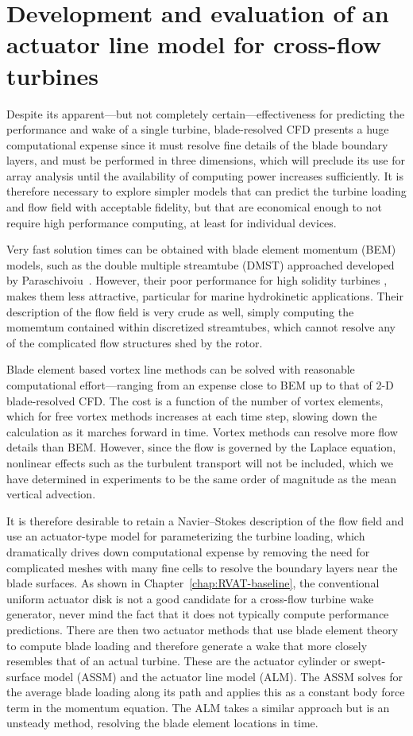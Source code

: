 \chapter{Development and evaluation of an actuator line model for cross-flow
    turbines}\label{chap:ALM}

Despite its apparent---but not completely certain---effectiveness for predicting
the performance and wake of a single turbine, blade-resolved CFD presents a huge
computational expense since it must resolve fine details of the blade boundary
layers, and must be performed in three dimensions, which will preclude its use
for array analysis until the availability of computing power increases
sufficiently. It is therefore necessary to explore simpler models that can
predict the turbine loading and flow field with acceptable fidelity, but that
are economical enough to not require high performance computing, at least for
individual devices.

Very fast solution times can be obtained with blade element momentum (BEM)
models, such as the double multiple streamtube (DMST) approached developed by
Paraschivoiu~\cite{Para1988}. However, their poor performance for high solidity
turbines \cite{Joo2015}, makes them less attractive, particular for marine
hydrokinetic applications. Their description of the flow field is very crude as
well, simply computing the momemtum contained within discretized streamtubes,
which cannot resolve any of the complicated flow structures shed by the rotor.

Blade element based vortex line methods can be solved with reasonable
computational effort---ranging from an expense close to BEM up to that of 2-D
blade-resolved CFD. The cost is a function of the number of vortex elements,
which for free vortex methods increases at each time step, slowing down the
calculation as it marches forward in time. Vortex methods can resolve more flow
details than BEM. However, since the flow is governed by the Laplace equation,
nonlinear effects such as the turbulent transport will not be included, which we
have determined in experiments to be the same order of magnitude as the mean
vertical advection.

It is therefore desirable to retain a Navier--Stokes description of the flow
field and use an actuator-type model for parameterizing the turbine loading,
which dramatically drives down computational expense by removing the need for
complicated meshes with many fine cells to resolve the boundary layers near the
blade surfaces. As shown in Chapter~\ref{chap:RVAT-baseline}, the conventional
uniform actuator disk is not a good candidate for a cross-flow turbine wake
generator, never mind the fact that it does not typically compute performance
predictions. There are then two actuator methods that use blade element theory
to compute blade loading and therefore generate a wake that more closely
resembles that of an actual turbine. These are the actuator cylinder or
swept-surface model (ASSM) and the actuator line model (ALM). The ASSM solves
for the average blade loading along its path and applies this as a constant body
force term in the momentum equation. The ALM takes a similar approach but is an
unsteady method, resolving the blade element locations in time.

